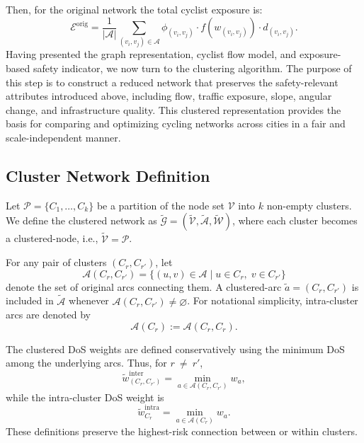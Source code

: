 \documentclass[lettersize,journal]{IEEEtran}
\begin{document}
Then, for the original network the total cyclist exposure is:
\begin{equation}
    \mathcal{E}^{\text{orig}} = \frac{1}{|\mathcal{A}|} \sum_{(v_{i},v_{j}) \in \mathcal{A}} \phi_{(v_{i},v_{j})} \cdot f(w_{(v_{i},v_{j})}) \cdot d_{(v_{i},v_{j})}.
\end{equation}
Having presented the graph representation, cyclist flow model, and exposure-based safety indicator, we now turn to the clustering algorithm. The purpose of this step is to construct a reduced network that preserves the safety-relevant attributes introduced above, including flow, traffic exposure, slope, angular change, and infrastructure quality. This clustered representation provides the basis for comparing and optimizing cycling networks across cities in a fair and scale-independent manner.



\subsection{Cluster Network Definition}

Let $\mathcal{P}=\{C_1,\dots,C_k\}$ be a partition of the node set $\mathcal{V}$ into
$k$ non-empty clusters. We define the clustered network as
$\tilde{\mathcal{G}}=(\tilde{\mathcal{V}},\tilde{\mathcal{A}},\tilde{\mathcal{W}})$,
where each cluster becomes a clustered-node, i.e.,
$\tilde{\mathcal{V}}=\mathcal{P}$.

For any pair of clusters $(C_r,C_{r'})$, let
\[
  \mathcal{A}(C_r,C_{r'})
  =
  \bigl\{(u,v)\in\mathcal{A}\mid u\in C_r,\; v\in C_{r'}\bigr\}
\]
denote the set of original arcs connecting them. A clustered-arc
$\tilde{a}=(C_r,C_{r'})$ is included in $\tilde{\mathcal{A}}$ whenever
$\mathcal{A}(C_r,C_{r'})\neq\varnothing$. For notational simplicity, intra-cluster
arcs are denoted by
\[
  \mathcal{A}(C_r):=\mathcal{A}(C_r,C_r).
\]

The clustered DoS weights are defined conservatively using the minimum DoS among
the underlying arcs. Thus, for $r~\neq ~r'$,
\begin{equation}
  \tilde{w}^{\mathrm{inter}}_{(C_r,C_{r'})}
  =
  \min_{a\in\mathcal{A}(C_r,C_{r'})} w_a,
\end{equation}
while the intra-cluster DoS weight is
\begin{equation}
  \tilde{w}^{\mathrm{intra}}_{C_r}
  =
  \min_{a\in\mathcal{A}(C_r)} w_a.
\end{equation}
These definitions preserve the highest-risk connection between or within clusters.
\end{document}
